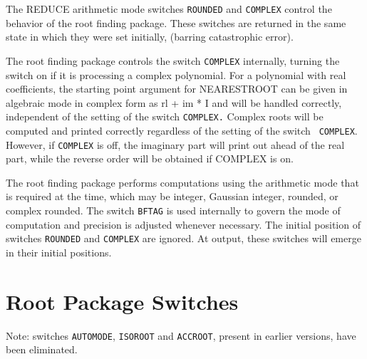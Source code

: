 The REDUCE arithmetic mode switches {\tt ROUNDED} and {\tt COMPLEX}
control the behavior of the root finding package.
These switches are returned in the same state in which they were set
initially, (barring catastrophic error).

\begin{description}
\item[COMPLEX] The root finding package controls the switch {\tt COMPLEX}
internally, turning the switch on if it is processing a complex
polynomial.
For a polynomial with real coefficients, the
starting point argument for NEARESTROOT can be given in algebraic mode in
complex form as rl + im * I and will be handled correctly, independent of
the setting of the switch {\tt COMPLEX.} Complex roots will be computed
and printed correctly regardless of the setting of the switch {\tt
COMPLEX}.  However, if {\tt COMPLEX} is off, the imaginary part will print
out ahead of the real part, while the reverse order will be obtained if
COMPLEX is on.

\item[ROUNDED] The
root finding package performs computations using the arithmetic mode that
is required at the time, which may be integer, Gaussian integer, rounded,
or complex rounded.  The switch {\tt BFTAG} is used internally to govern
the mode of computation and precision is adjusted whenever necessary.  The
initial position of switches {\tt ROUNDED} and {\tt COMPLEX} are ignored.
At output, these switches will emerge in their initial positions.
\end{description}

\section{Root Package Switches}

Note: switches {\tt AUTOMODE}, {\tt ISOROOT} and {\tt ACCROOT}, present in
earlier versions, have been eliminated.

